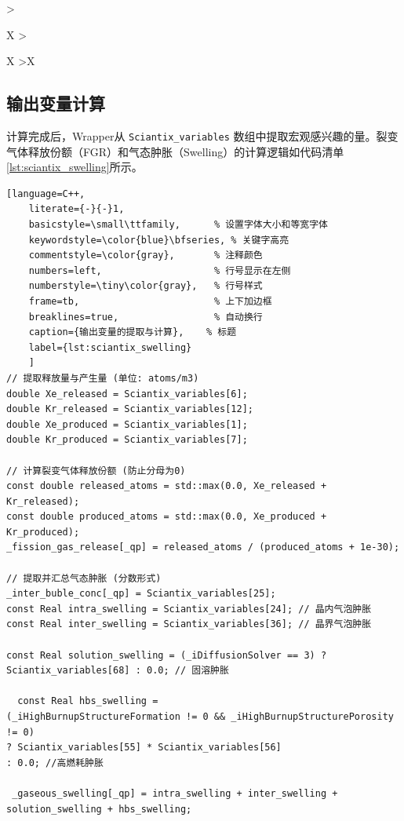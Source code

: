\begin{xltabular}{\textwidth}{
		>{\hsize\raggedright\arraybackslash}X
		>{\hsize\raggedright\arraybackslash}X
		>{\hsize\centering\arraybackslash}X
	}
\end{xltabular}

\subsection{输出变量计算}
计算完成后，Wrapper从 \texttt{Sciantix\_variables} 数组中提取宏观感兴趣的量。裂变气体释放份额（FGR）和气态肿胀（Swelling）的计算逻辑如代码清单\ref{lst:sciantix_swelling}所示。

\begin{lstlisting}[language=C++,
	literate={-}{-}1, 
	basicstyle=\small\ttfamily,      % 设置字体大小和等宽字体
	keywordstyle=\color{blue}\bfseries, % 关键字高亮
	commentstyle=\color{gray},       % 注释颜色
	numbers=left,                    % 行号显示在左侧
	numberstyle=\tiny\color{gray},   % 行号样式
	frame=tb,                        % 上下加边框
	breaklines=true,                 % 自动换行
	caption={输出变量的提取与计算},    % 标题 
	label={lst:sciantix_swelling}
	]
// 提取释放量与产生量 (单位: atoms/m3)
double Xe_released = Sciantix_variables[6];
double Kr_released = Sciantix_variables[12];
double Xe_produced = Sciantix_variables[1];
double Kr_produced = Sciantix_variables[7];

// 计算裂变气体释放份额 (防止分母为0)
const double released_atoms = std::max(0.0, Xe_released + Kr_released);
const double produced_atoms = std::max(0.0, Xe_produced + Kr_produced);
_fission_gas_release[_qp] = released_atoms / (produced_atoms + 1e-30);

// 提取并汇总气态肿胀 (分数形式)
_inter_buble_conc[_qp] = Sciantix_variables[25];
const Real intra_swelling = Sciantix_variables[24]; // 晶内气泡肿胀
const Real inter_swelling = Sciantix_variables[36]; // 晶界气泡肿胀

const Real solution_swelling = (_iDiffusionSolver == 3) ? Sciantix_variables[68] : 0.0; // 固溶肿胀

  const Real hbs_swelling =
(_iHighBurnupStructureFormation != 0 && _iHighBurnupStructurePorosity != 0)
? Sciantix_variables[55] * Sciantix_variables[56]
: 0.0; //高燃耗肿胀

 _gaseous_swelling[_qp] = intra_swelling + inter_swelling + solution_swelling + hbs_swelling;
\end{lstlisting}
